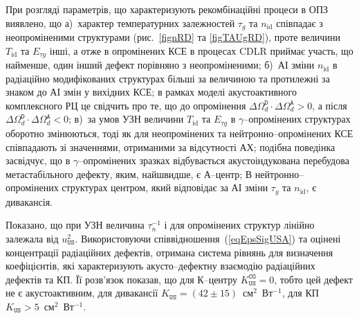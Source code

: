 При розгляді параметрів, що характеризують рекомбінаційні процеси в ОПЗ виявлено, що
а)~характер температурних залежностей  $\tau_{g}$ та $n_\mathrm{id}$ співпадає з неопроміненими структурами (рис.~\ref{fignRD} та \ref{figTAUgRD}), проте величини $T_{\mathrm{id}}$ та $E_{\tau g}$ інші, а отже
в опромінених КСЕ в  процесах CDLR приймає участь, що найменше, один інший дефект порівняно з неопроміненими;
б)~АІ зміни $n_\mathrm{id}$ в радіаційно модифікованих структурах більші за величиною та протилежні за знаком до АІ змін у вихідних КСЕ;
в рамках моделі акустоактивного комплексного РЦ це свідчить про те, що до опромінення $\Delta\Omega_d^\mathtt{D}\cdot\Delta\Omega_d^\mathtt{A}>0$, а після $\Delta\Omega_d^\mathtt{D}\cdot\Delta\Omega_d^\mathtt{A}<0$;
в)~за умов УЗН величини $T_{\mathrm{id}}$ та $E_{\tau g}$ в $\gamma$--опромінених структурах оборотно змінюються,
тоді як для неопромінених та нейтронно--опромінених КСЕ співпадають зі значеннями, отриманими за відсутності АХ;
подібна поведінка засвідчує, що в $\gamma$--опромінених зразках відбувається акустоіндукована перебудова метастабільного дефекту, яким, найшвидше, є А--центр;
В нейтронно--опромінених структурах центром, який відповідає за АІ зміни $\tau_{g}$ та $n_\mathrm{id}$, є дивакансія.

Показано, що при УЗН величина $\tau_n^{-1}$ і для опромінених структур лінійно залежала від $u_{\mathtt{US}}^2$.
Використовуючи співвідношення~(\ref{eqEpsSigUSA}) та оцінені концентрації радіаційних дефектів, отримана система рівнянь для визначення коефіцієнтів, які характеризують акусто--дефектну взаємодію радіаційних дефектів та КП.
Її розв'язок показав, що для К--центру $K_\mathtt{US}^\mathtt{CO}=0$, тобто цей дефект не є акустоактивним,
для дивакансії $K_\mathtt{US}=(42\pm15)$~см$^2$~Вт$^{-1}$, для КП $K_\mathtt{US}>5$~см$^2$~Вт$^{-1}$.

